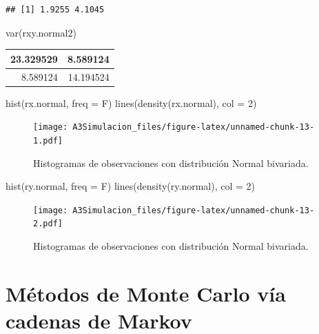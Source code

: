 \documentclass[
  10pt,
  spanish,
]{book}
\newenvironment{Shaded}{\begin{snugshade}}{\end{snugshade}}
\newcommand{\AttributeTok}[1]{\textcolor[rgb]{0.77,0.63,0.00}{#1}}
\newcommand{\DecValTok}[1]{\textcolor[rgb]{0.00,0.00,0.81}{#1}}
\newcommand{\FunctionTok}[1]{\textcolor[rgb]{0.00,0.00,0.00}{#1}}
\newcommand{\NormalTok}[1]{#1}
\theoremstyle{definition}
\theoremstyle{definition}
\theoremstyle{definition}
\theoremstyle{definition}
\theoremstyle{remark}
\begin{document}
\begin{verbatim}
## [1] 1.9255 4.1045
\end{verbatim}

\begin{Shaded}
\begin{Highlighting}[]
\FunctionTok{var}\NormalTok{(rxy.normal2)}
\end{Highlighting}
\end{Shaded}

\begin{tabular}{r|r}
\hline
23.329529 & 8.589124\\
\hline
8.589124 & 14.194524\\
\hline
\end{tabular}

\begin{Shaded}
\begin{Highlighting}[]
\FunctionTok{hist}\NormalTok{(rx.normal, }\AttributeTok{freq =}\NormalTok{ F)}
\FunctionTok{lines}\NormalTok{(}\FunctionTok{density}\NormalTok{(rx.normal), }\AttributeTok{col =} \DecValTok{2}\NormalTok{)}
\end{Highlighting}
\end{Shaded}

\begin{figure}
\centering
\texttt{[image: A3Simulacion\_files/figure-latex/unnamed-chunk-13-1.pdf]}
\caption{\label{fig:unnamed-chunk-13-1}Histogramas de observaciones con distribución Normal bivariada.}
\end{figure}

\begin{Shaded}
\begin{Highlighting}[]
\FunctionTok{hist}\NormalTok{(ry.normal, }\AttributeTok{freq =}\NormalTok{ F)}
\FunctionTok{lines}\NormalTok{(}\FunctionTok{density}\NormalTok{(ry.normal), }\AttributeTok{col =} \DecValTok{2}\NormalTok{)}
\end{Highlighting}
\end{Shaded}

\begin{figure}
\centering
\texttt{[image: A3Simulacion\_files/figure-latex/unnamed-chunk-13-2.pdf]}
\caption{\label{fig:unnamed-chunk-13-2}Histogramas de observaciones con distribución Normal bivariada.}
\end{figure}

\hypertarget{muxe9todos-de-monte-carlo-vuxeda-cadenas-de-markov}{%
\section{Métodos de Monte Carlo vía cadenas de Markov}\label{muxe9todos-de-monte-carlo-vuxeda-cadenas-de-markov}}
\end{document}
